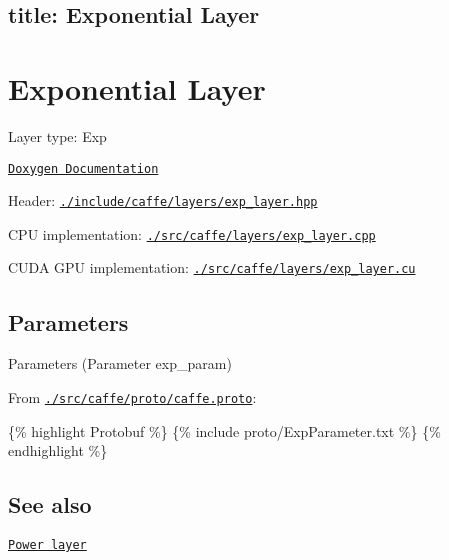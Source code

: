 

 \subsection*{title\+: Exponential Layer }

\section*{Exponential Layer}


\begin{DoxyItemize}
\item Layer type\+: {\ttfamily Exp}
\item \href{http://caffe.berkeleyvision.org/doxygen/classcaffe_1_1ExpLayer.html}{\tt Doxygen Documentation}
\item Header\+: \href{https://github.com/BVLC/caffe/blob/master/include/caffe/layers/exp_layer.hpp}{\tt {\ttfamily ./include/caffe/layers/exp\+\_\+layer.hpp}}
\item C\+PU implementation\+: \href{https://github.com/BVLC/caffe/blob/master/src/caffe/layers/exp_layer.cpp}{\tt {\ttfamily ./src/caffe/layers/exp\+\_\+layer.cpp}}
\item C\+U\+DA G\+PU implementation\+: \href{https://github.com/BVLC/caffe/blob/master/src/caffe/layers/exp_layer.cu}{\tt {\ttfamily ./src/caffe/layers/exp\+\_\+layer.cu}}
\end{DoxyItemize}

\subsection*{Parameters}


\begin{DoxyItemize}
\item Parameters ({\ttfamily Parameter exp\+\_\+param})
\item From \href{https://github.com/BVLC/caffe/blob/master/src/caffe/proto/caffe.proto}{\tt {\ttfamily ./src/caffe/proto/caffe.proto}}\+:
\end{DoxyItemize}

\{\% highlight Protobuf \%\} \{\% include proto/\+Exp\+Parameter.\+txt \%\} \{\% endhighlight \%\}

\subsection*{See also}


\begin{DoxyItemize}
\item \href{power.html}{\tt Power layer} 
\end{DoxyItemize}